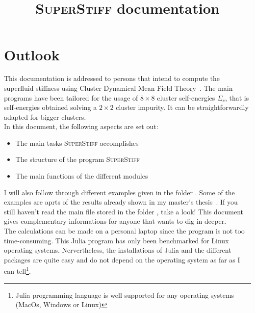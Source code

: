\documentclass{article}
\title{
\textmd{\textsc{SuperStiff} documentation}\\
\vspace{6in}
\vspace{1cm}
}
\begin{document}

\maketitle

\newpage
\tableofcontents
\newpage


\section{Outlook}
\label{sec:outlook}

This documentation is addressed to persons that intend to compute the superfluid stiffness using Cluster Dynamical Mean Field Theory~\cite{charlebois_these}. The main programs have been tailored for the usage of $8\times 8$ cluster self-energies $\Sigma_c$, that is self-energies obtained solving a $2\times 2$ cluster impurity. It can be straightforwardly adapted for bigger clusters.\\


In this document, the following aspects are set out:
\begin{itemize}
\item The main tasks \textsc{SuperStiff} accomplishes
\item The structure of the program \textsc{SuperStiff}
\item The main functions of the different modules
\end{itemize}

I will also follow through different examples given in the folder . Some of the examples are aprts of the results already shown in my master's thesis~\cite{simard_master}. If you still haven't read the main  file stored in the folder , take a look! This document gives complementary informations for anyone that wants to dig in deeper.\\

The calculations can be made on a personal laptop since the program is not too time-consuming. This Julia program has only been benchmarked for Linux operating systems. Nervertheless, the installations of Julia and the different packages are quite easy and do not depend on the operating system as far as I can tell\footnote{Julia programming language is well supported for any operating systems (MacOs, Windows or Linux)}. 
\end{document}
